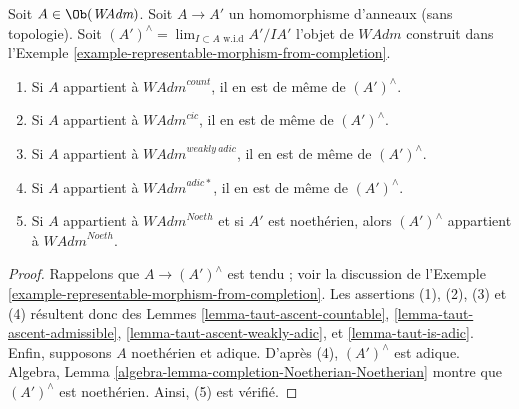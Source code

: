 \begin{lemma}
\label{lemma-completion-in-sub}
Soit $A \in \Ob(\textit{WAdm})$. Soit $A \to A'$ un homomorphisme
d'anneaux (sans topologie). Soit $(A')^\wedge = \lim_{I \subset A\text{ w.i.d}} A'/IA'$
l'objet de $\textit{WAdm}$ construit dans
l'Exemple \ref{example-representable-morphism-from-completion}.
\begin{enumerate}
\item Si $A$ appartient à $\textit{WAdm}^{count}$, il en est de même de $(A')^\wedge$.
\item Si $A$ appartient à $\textit{WAdm}^{cic}$, il en est de même de $(A')^\wedge$.
\item Si $A$ appartient à $\textit{WAdm}^{weakly\ adic}$, il en est de même de $(A')^\wedge$.
\item Si $A$ appartient à $\textit{WAdm}^{adic*}$, il en est de même de $(A')^\wedge$.
\item Si $A$ appartient à $\textit{WAdm}^{Noeth}$ et si $A'$ est noethérien, alors
$(A')^\wedge$ appartient à $\textit{WAdm}^{Noeth}$.
\end{enumerate}
\end{lemma}

\begin{proof}
Rappelons que $A \to (A')^\wedge$ est tendu ; voir la discussion de
l'Exemple \ref{example-representable-morphism-from-completion}.
Les assertions (1), (2), (3) et (4) résultent donc des Lemmes
\ref{lemma-taut-ascent-countable},
\ref{lemma-taut-ascent-admissible},
\ref{lemma-taut-ascent-weakly-adic}, et
\ref{lemma-taut-is-adic}.
Enfin, supposons $A$ noethérien et adique.
D'après (4), $(A')^\wedge$ est adique.
Algebra, Lemma \ref{algebra-lemma-completion-Noetherian-Noetherian}
montre que $(A')^\wedge$ est noethérien. Ainsi, (5) est vérifié.
\end{proof}

